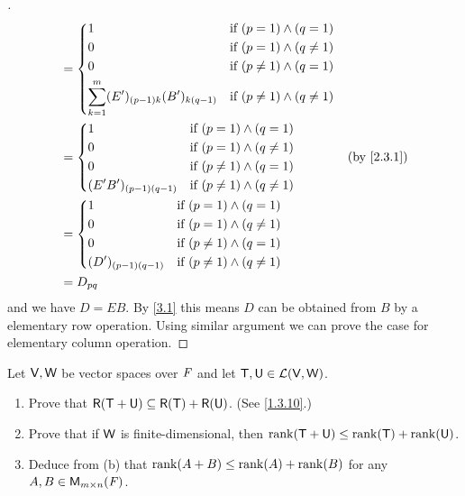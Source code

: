 \begin{proof}[]
\begin{align*}
     & = \begin{dcases}
           1                                                & \text{if } (p = 1) \land (q = 1)       \\
           0                                                & \text{if } (p = 1) \land (q \neq 1)    \\
           0                                                & \text{if } (p \neq 1) \land (q = 1)    \\
           \sum_{k = 1}^m (E')_{(p - 1) k} (B')_{k (q - 1)} & \text{if } (p \neq 1) \land (q \neq 1)
         \end{dcases}                                      \\
     & = \begin{dcases}
           1                         & \text{if } (p = 1) \land (q = 1)       \\
           0                         & \text{if } (p = 1) \land (q \neq 1)    \\
           0                         & \text{if } (p \neq 1) \land (q = 1)    \\
           (E' B')_{(p - 1) (q - 1)} & \text{if } (p \neq 1) \land (q \neq 1)
         \end{dcases}                              &  & \text{(by \cref{2.3.1})}                                                        \\
     & = \begin{dcases}
           1                      & \text{if } (p = 1) \land (q = 1)       \\
           0                      & \text{if } (p = 1) \land (q \neq 1)    \\
           0                      & \text{if } (p \neq 1) \land (q = 1)    \\
           (D')_{(p - 1) (q - 1)} & \text{if } (p \neq 1) \land (q \neq 1)
         \end{dcases}                                                                \\
     & = D_{p q}
  \end{align*}
  and we have \(D = EB\).
  By \cref{3.1} this means \(D\) can be obtained from \(B\) by a elementary row operation.
  Using similar argument we can prove the case for elementary column operation.
\end{proof}

\setcounter{ex}{13}
\begin{ex}\label{ex:3.2.14}
  Let \(\mathsf{V}, \mathsf{W}\) be vector spaces over \(\mathit{F}\) and let \(\mathsf{T}, \mathsf{U} \in \mathcal{L}(\mathsf{V}, \mathsf{W})\).
  \begin{enumerate}
    \item Prove that \(\rg{\T + \U} \subseteq \rg{\T} + \rg{\U}\).
          (See \cref{1.3.10}.)
    \item Prove that if \(\mathsf{W}\) is finite-dimensional, then \(\rk{\T + \U} \leq \rk{\T} + \rk{\U}\).
    \item Deduce from (b) that \(\rk{A + B} \leq \rk{A} + \rk{B}\) for any \(A, B \in \mathsf{M}_{{m} \times n}({\mathit{F}})\).
  \end{enumerate}
\end{ex}


